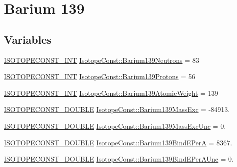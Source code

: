 \hypertarget{group___isotope_const-_barium-_ba139}{}\section{Barium 139}
\label{group___isotope_const-_barium-_ba139}
\subsection*{Variables}
\begin{DoxyCompactItemize}
\item 
\mbox{\hyperlink{group___isotope_const-_macros_ga5f18360b3e99483a35c32d789e62621c}{I\+S\+O\+T\+O\+P\+E\+C\+O\+N\+S\+T\+\_\+\+I\+NT}} \mbox{\hyperlink{group___isotope_const-_barium-_ba139_ga2d3feab01fe431d855515f093fdacddb}{Isotope\+Const\+::\+Barium139\+Neutrons}} = 83
\item 
\mbox{\hyperlink{group___isotope_const-_macros_ga5f18360b3e99483a35c32d789e62621c}{I\+S\+O\+T\+O\+P\+E\+C\+O\+N\+S\+T\+\_\+\+I\+NT}} \mbox{\hyperlink{group___isotope_const-_barium-_ba139_ga76fcf205d6ff2044f3245eccb87a92db}{Isotope\+Const\+::\+Barium139\+Protons}} = 56
\item 
\mbox{\hyperlink{group___isotope_const-_macros_ga5f18360b3e99483a35c32d789e62621c}{I\+S\+O\+T\+O\+P\+E\+C\+O\+N\+S\+T\+\_\+\+I\+NT}} \mbox{\hyperlink{group___isotope_const-_barium-_ba139_gaf94e7cffcdc2c75fbe44cd070bac7f42}{Isotope\+Const\+::\+Barium139\+Atomic\+Weight}} = 139
\item 
\mbox{\hyperlink{group___isotope_const-_macros_ga8f45a7272ce02c0b4c65c44636ed719a}{I\+S\+O\+T\+O\+P\+E\+C\+O\+N\+S\+T\+\_\+\+D\+O\+U\+B\+LE}} \mbox{\hyperlink{group___isotope_const-_barium-_ba139_gaa83a2fff03d07d248f2a0d21d50c715b}{Isotope\+Const\+::\+Barium139\+Mass\+Exc}} = -\/84913.
\item 
\mbox{\hyperlink{group___isotope_const-_macros_ga8f45a7272ce02c0b4c65c44636ed719a}{I\+S\+O\+T\+O\+P\+E\+C\+O\+N\+S\+T\+\_\+\+D\+O\+U\+B\+LE}} \mbox{\hyperlink{group___isotope_const-_barium-_ba139_ga38559e2d5de89fca0709afd7ba5b4d7e}{Isotope\+Const\+::\+Barium139\+Mass\+Exc\+Unc}} = 0.
\item 
\mbox{\hyperlink{group___isotope_const-_macros_ga8f45a7272ce02c0b4c65c44636ed719a}{I\+S\+O\+T\+O\+P\+E\+C\+O\+N\+S\+T\+\_\+\+D\+O\+U\+B\+LE}} \mbox{\hyperlink{group___isotope_const-_barium-_ba139_ga67a1cde49df3acc082f3d4ddd07342aa}{Isotope\+Const\+::\+Barium139\+Bind\+E\+PerA}} = 8367.
\item 
\mbox{\hyperlink{group___isotope_const-_macros_ga8f45a7272ce02c0b4c65c44636ed719a}{I\+S\+O\+T\+O\+P\+E\+C\+O\+N\+S\+T\+\_\+\+D\+O\+U\+B\+LE}} \mbox{\hyperlink{group___isotope_const-_barium-_ba139_gaee315dee0105cbf8dfdec757c85c84ba}{Isotope\+Const\+::\+Barium139\+Bind\+E\+Per\+A\+Unc}} = 0.

\end{DoxyCompactItemize}
